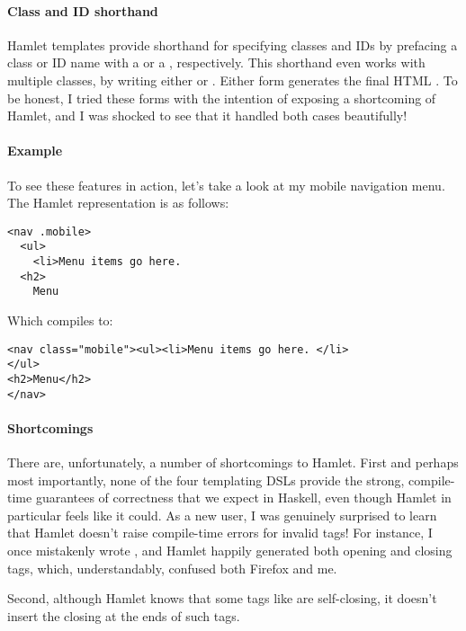 \paragraph{Class and ID shorthand} Hamlet templates provide shorthand for specifying classes and IDs by prefacing a class or ID name with a  or a \code{\#}, respectively. This shorthand even works with multiple classes, by writing either  or . Either form generates the final HTML . To be honest, I tried these forms with the intention of exposing a shortcoming of Hamlet, and I was shocked to see that it handled both cases beautifully!

\paragraph{Example} To see these features in action, let's take a look at my mobile navigation menu. The Hamlet representation is as follows: 

\begin{Verbatim}
<nav .mobile>
  <ul>
    <li>Menu items go here. 
  <h2>
    Menu
\end{Verbatim}

Which compiles to:

\begin{Verbatim}
<nav class="mobile"><ul><li>Menu items go here. </li>
</ul>
<h2>Menu</h2>
</nav>
\end{Verbatim}

\paragraph{Shortcomings} There are, unfortunately, a number of shortcomings to Hamlet. First and perhaps most importantly, none of the four templating DSLs provide the strong, compile-time guarantees of correctness that we expect in Haskell, even though Hamlet in particular feels like it could. As a new user, I was genuinely surprised to learn that Hamlet doesn't raise compile-time errors for invalid tags! For instance, I once mistakenly wrote , and Hamlet happily generated both opening and closing  tags, which, understandably, confused both Firefox and me.

Second, although Hamlet knows that some tags like  are self-closing, it doesn't insert the closing \code{/} at the ends of such tags.


